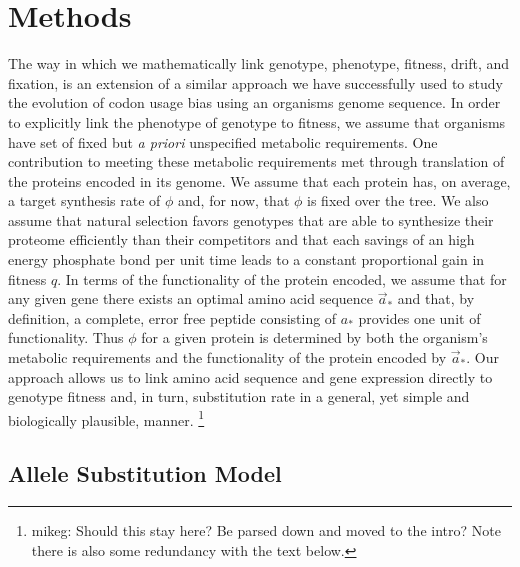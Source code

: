 \documentclass{article}
\newcommand{\aopt}{\ensuremath{a_*}\xspace}
\newcommand{\aoptvec}{\ensuremath{\Vec{a}_*}\xspace}
\begin{document}
\section*{Methods}\label{sec:methods}
The way in which we mathematically link genotype, phenotype, fitness, drift, and fixation, is an extension of a similar approach we have successfully used to study the evolution of codon usage bias using an organisms genome sequence\citep{GilchristAndWagner2006,Gilchrist2007,ShahAndGilchrist2011,GilchristEtAl2015}.
In order to explicitly link the phenotype of genotype to fitness, we assume that organisms have set of fixed but \emph{a priori} unspecified metabolic requirements.
One contribution to meeting these metabolic requirements met through translation of the proteins encoded in its genome.
We assume that each protein has, on average, a target synthesis rate of $\phi$ and, for now, that $\phi$ is fixed over the tree.
We also assume that natural selection favors genotypes that are able to synthesize their proteome efficiently than their competitors and that each savings of an high energy phosphate bond per unit time leads to a constant proportional gain in fitness $q$.
In terms of the functionality of the protein encoded, we assume that for any given gene there exists an optimal amino acid sequence \aoptvec and that, by definition, a complete, error free peptide consisting of \aopt provides one unit of functionality.
Thus $\phi$ for a given protein is determined by both the organism's metabolic requirements and the functionality of the protein encoded by \aoptvec.
Our approach allows us to link amino acid sequence and gene expression directly to genotype fitness and, in turn, substitution rate in a general, yet simple and biologically plausible, manner.
\footnote{mikeg: Should this stay here?  
  Be parsed down and moved to the intro? 
  Note there is also some redundancy with the text below.}

\subsection*{Allele Substitution Model}
\end{document}
